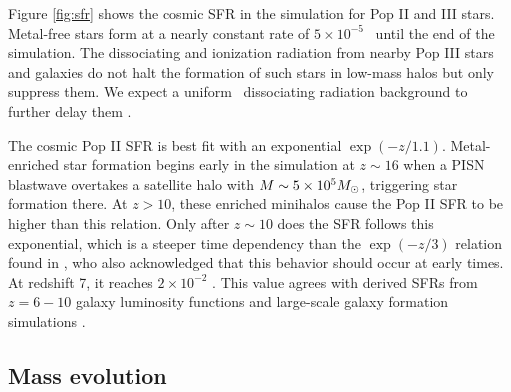 \documentclass[apj]{emulateapj}
\begin{document}

Figure \ref{fig:sfr} shows the cosmic SFR in the simulation for Pop II
and III stars.  Metal-free stars form at a nearly constant rate of $5
\times 10^{-5}$ \sfr~until the end of the simulation.  The
dissociating and ionization radiation from nearby Pop III stars and
galaxies do not halt the formation of such stars in low-mass halos
but only suppress them.  We expect a uniform \hh~dissociating
radiation background to further delay them \citep{Machacek01, Wise07,
  OShea08}.

The cosmic Pop II SFR is best fit with an exponential $\exp(-z/1.1)$.
Metal-enriched star formation begins early in the simulation at $z
\sim 16$ when a PISN blastwave overtakes a satellite halo with $M \sim
5 \times 10^5 \Ms$, triggering star formation there.  At $z>10$, these
enriched minihalos cause the Pop II SFR to be higher than this
relation.  Only after $z \sim 10$ does the SFR follows this
exponential, which is a steeper time dependency than the $\exp(-z/3)$
relation found in \citet{Hernquist03}, who also acknowledged that this
behavior should occur at early times.  At redshift 7, it reaches $2
\times 10^{-2}$ \sfr.  This value agrees with derived SFRs from
$z=6-10$ galaxy luminosity functions \citep[e.g.][]{Bouwens11} and
large-scale galaxy formation simulations \citep[e.g.][]{Schaye10}.

\subsection{Mass evolution}
\label{sec:halo}



\begin{figure*}
\caption{\label{fig:evo} (a) Evolution of the total halo mass (top),
  stellar mass (middle), and gas fraction (bottom) of the quiet
  (dashed) and intense (solid) halos.  In the top panel, the filtering
  halo mass is plotted as the thick black line (overlapping with the
  quiet halo after $z=9$.  (b) Mass-weighted stellar metallicities and
  gas metallicities enriched by Pop II and Pop III SNe of the intense
  (top) and quiet (bottom) halos.}
\end{figure*}
\end{document}
